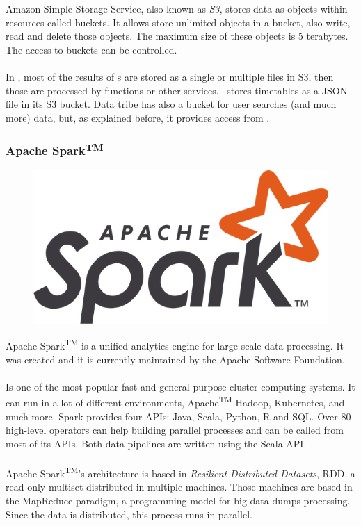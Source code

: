 Amazon Simple Storage Service\cite{s3}, also known as \textit{S3}, stores data as objects within resources called buckets. It allows store unlimited objects in a bucket, also write, read and delete those objects. The maximum size of these objects is 5 terabytes. The access to buckets can be controlled.
\\\\
In \company, most of the results of s are stored as a single or multiple files in S3, then those are processed by  functions or other services. \squad\ stores timetables as a JSON\cite{json} file in its S3 bucket. Data tribe has also a bucket for user searches (and much more) data, but, as explained before, it provides access from .

\subsubsection{Apache Spark\textsuperscript{TM}} \label{apache_spark}

\begin{figure}[H]
\includegraphics[scale=0.1]{resources/apache-spark_logo.png}
\end{figure}

Apache Spark\textsuperscript{TM} is a unified analytics engine for large-scale data processing. It was created and it is currently maintained by the Apache Software Foundation\cite{apache_software_foundation}.
\\\\
Is one of the most popular fast and general-purpose cluster computing systems. It can run in a lot of different environments, Apache\textsuperscript{TM} Hadoop\textregistered\cite{hadoop}, Kubernetes\cite{k8s},  and much more. Spark provides four APIs: Java, Scala, Python, R and SQL. Over 80 high-level operators can help building parallel processes and can be called from most of its APIs. Both data pipelines are written using the Scala API.
\\\\
Apache Spark\textsuperscript{TM}'s architecture is based in \textit{Resilient Distributed Datasets}, RDD, a read-only multiset distributed in multiple machines. Those machines are based in the MapReduce paradigm, a programming model for big data dumps processing. Since the data is distributed, this process runs in parallel.

